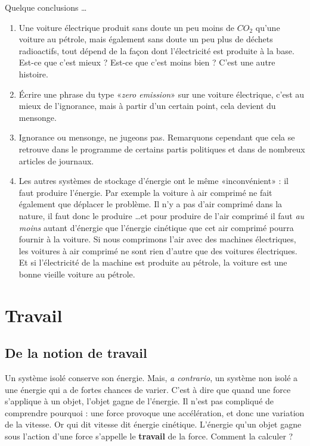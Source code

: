 \documentclass[a4paper,12pt]{book}
\theoremstyle{mes_exemples}	\newtheorem{exemple}[numtho]{Exemple}
\theoremstyle{mes_tho}
\newcommand{\defe}[2]{\textbf{#1}\index{#2}}
\begin{document}
Quelque conclusions \ldots
\begin{enumerate}

	\item
		Une voiture électrique produit sans doute un peu moins de $CO_2$ qu'une voiture au pétrole, mais également sans doute un peu plus de déchets radioactifs, tout dépend de la façon dont l'électricité est produite à la base. Est-ce que c'est mieux ? Est-ce que c'est moins bien ? C'est une autre histoire.

	\item
		Écrire une phrase du type «\emph{zero emission}» sur une voiture électrique, c'est au mieux de l'ignorance, mais à partir d'un certain point, cela devient du mensonge.
	
	\item
		Ignorance ou mensonge, ne jugeons pas. Remarquons cependant que cela se retrouve dans le programme de certains partis politiques et dans de nombreux articles de journaux.
	\item
		Les autres systèmes de stockage d'énergie ont le même «inconvénient» : il faut produire l'énergie. Par exemple la voiture à air comprimé ne fait également que déplacer le problème. Il n'y a pas d'air comprimé dans la nature, il faut donc le produire \ldots et pour produire de l'air comprimé il faut \emph{au moins} autant d'énergie que l'énergie cinétique que cet air comprimé pourra fournir à la voiture. Si nous comprimons l'air avec des machines électriques, les voitures à air comprimé ne sont rien d'autre que des voitures électriques. Et si l'électricité de la machine est produite au pétrole, la voiture est une bonne vieille voiture au pétrole.

\end{enumerate}




\section{Travail}


\subsection{De la notion de travail}

Un système isolé conserve son énergie. Mais, \emph{a contrario}, un système non isolé a une énergie qui a de fortes chances de varier. C'est à dire que quand une force s'applique à un objet, l'objet gagne de l'énergie. Il n'est pas compliqué de comprendre pourquoi : une force provoque une accélération, et donc une variation de la vitesse. Or qui dit vitesse dit énergie cinétique. L'énergie qu'un objet gagne sous l'action d'une force s'appelle le \defe{travail}{} de la force. Comment la calculer ? 
\end{document}
